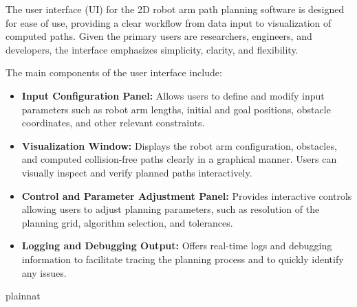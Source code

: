 \documentclass[12pt, titlepage]{article}
\begin{document}
The user interface (UI) for the 2D robot arm path planning software is designed for ease of use, providing a clear workflow from data input to visualization of computed paths. Given the primary users are researchers, engineers, and developers, the interface emphasizes simplicity, clarity, and flexibility.

The main components of the user interface include:

\begin{itemize}
    \item \textbf{Input Configuration Panel:}  
    Allows users to define and modify input parameters such as robot arm lengths, initial and goal positions, obstacle coordinates, and other relevant constraints.

    \item \textbf{Visualization Window:}  
      Displays the robot arm configuration, obstacles, and computed collision-free paths clearly in a graphical manner. Users can visually inspect and verify planned paths interactively.

    \item \textbf{Control and Parameter Adjustment Panel:}  
      Provides interactive controls allowing users to adjust planning parameters, such as resolution of the planning grid, algorithm selection, and tolerances.

    \item \textbf{Logging and Debugging Output:}  
      Offers real-time logs and debugging information to facilitate tracing the planning process and to quickly identify any issues.

    \end{itemize}







 {plainnat}


\newpage{}
\end{document}
